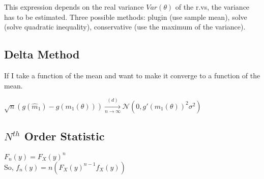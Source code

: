 This expression depends on the real variance $Var(\theta)$ of the r.vs, the variance has to be estimated. Three possible methods: plugin (use sample mean), solve (solve quadratic inequality), conservative (use the maximum of the variance).\\

\subsection*{Delta Method}

If I take a function of the mean and want to make it converge to a function of the mean. 

$\sqrt{n}(g(\widehat{m}_1) - g(m_1(\theta ))) \xrightarrow [n \to \infty ]{(d)} \mathcal{N}(0, g'(m_1(\theta ))^2 \sigma ^2)$

\subsection*{$N^{th}$ Order Statistic}

$F_n(y) = F_X(y)^n$\\
So, $f_n(y) = n(F_X(y)^{n-1}f_X(y))$